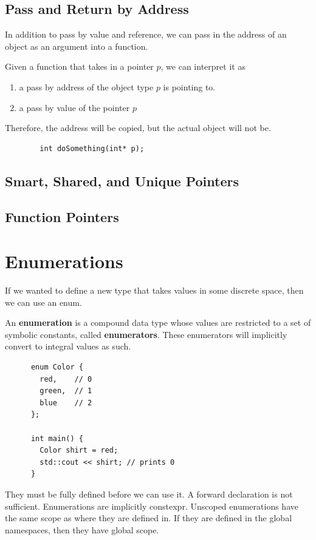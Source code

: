 \documentclass{article}
\newcounter{definition}[section]
\begin{document}
  \subsection{Pass and Return by Address} 

    In addition to pass by value and reference, we can pass in the address of an object as an argument into a function. 

    \begin{definition}
      \label{def:pass-by-address}
      Given a function that takes in a pointer $p$, we can interpret it as 
      \begin{enumerate}
        \item a pass by address of the object type $p$ is pointing to. 
        \item a pass by value of the pointer $p$
      \end{enumerate}
      Therefore, the address will be copied, but the actual object will not be. 

      \begin{lstlisting}
        int doSomething(int* p);  
      \end{lstlisting}
    \end{definition}  

  \subsection{Smart, Shared, and Unique Pointers} 

  \subsection{Function Pointers}

\section{Enumerations} 

  If we wanted to define a new type that takes values in some discrete space, then we can use an enum. 

  \begin{definition}
    \label{def:unscoped-enumerations}
    An \textbf{enumeration} is a compound data type whose values are restricted to a set of symbolic constants, called \textbf{enumerators}. These enumerators will implicitly convert to integral values as such. 
    \begin{lstlisting}
      enum Color {
        red,    // 0
        green,  // 1 
        blue    // 2
      };

      int main() {
        Color shirt = red; 
        std::cout << shirt; // prints 0
      }
    \end{lstlisting}
    They must be fully defined before we can use it. A forward declaration is not sufficient. Enumerations are implicitly constexpr. Unscoped enumerations have the same scope as where they are defined in. If they are defined in the global namespaces, then they have global scope. 
  \end{definition}
\end{document}

